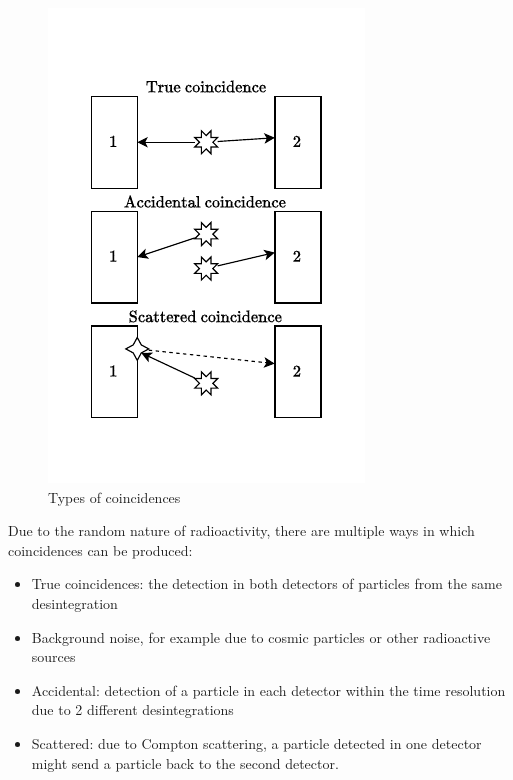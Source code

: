 \begin{figure}
    \includegraphics[width=\linewidth, trim={0 1cm 0 1.2cm}, clip]{figures/coincidence_types.pdf}
    \caption{Types of coincidences}
\end{figure}
Due to the random nature of radioactivity, there are multiple ways in which coincidences can be produced:
\begin{itemize}
    \item True coincidences: the detection in both detectors of particles from the same desintegration
    \item Background noise, for example due to cosmic particles or other radioactive sources
    \item Accidental: detection of a particle in each detector within the time resolution due to 2 different desintegrations
    \item Scattered: due to Compton scattering, a particle detected in one detector might send a particle back to the second detector.
\end{itemize}

